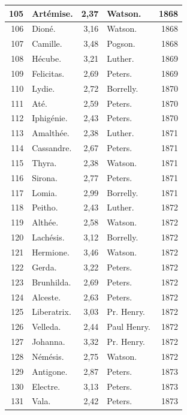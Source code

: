 \documentclass[a4paper, 11pt, oneside]{article}
\begin{document}
\begin{center}
\begin{longtable}{|r|l|r|l|r|}
        105 & Artémise. & 2,37 & Watson. & 1868 \\ \hline
        106 & Dioné. & 3,16 & Watson. & 1868 \\ \hline
        107 & Camille. & 3,48 & Pogson. & 1868 \\ \hline
        108 & Hécube. & 3,21 & Luther. & 1869 \\ \hline
        109 & Felicitas. & 2,69 & Peters. & 1869 \\ \hline
        110 & Lydie. & 2,72 & Borrelly. & 1870 \\ \hline
        111 & Até. & 2,59 & Peters. & 1870 \\ \hline
        112 & Iphigénie. & 2,43 & Peters. & 1870 \\ \hline
        113 & Amalthée. & 2,38 & Luther. & 1871 \\ \hline
        114 & Cassandre. & 2,67 & Peters. & 1871 \\ \hline
        115 & Thyra. & 2,38 & Watson. & 1871 \\ \hline
        116 & Sirona. & 2,77 & Peters. & 1871 \\ \hline
        117 & Lomia. & 2,99 & Borrelly. & 1871 \\ \hline
        118 & Peitho. & 2,43 & Luther. & 1872 \\ \hline
        119 & Althée. & 2,58 & Watson. & 1872 \\ \hline
        120 & Lachésis. & 3,12 & Borrelly. & 1872 \\ \hline
        121 & Hermione. & 3,46 & Watson. & 1872 \\ \hline
        122 & Gerda. & 3,22 & Peters. & 1872 \\ \hline
        123 & Brunhilda. & 2,69 & Peters. & 1872 \\ \hline
        124 & Alceste. & 2,63 & Peters. & 1872 \\ \hline
        125 & Liberatrix. & 3,03 & Pr. Henry. & 1872 \\ \hline
        126 & Velleda. & 2,44 & Paul Henry. & 1872 \\ \hline
        127 & Johanna. & 3,32 & Pr. Henry. & 1872 \\ \hline
        128 & Némésis. & 2,75 & Watson. & 1872 \\ \hline
        129 & Antigone. & 2,87 & Peters. & 1873 \\ \hline
        130 & Electre. & 3,13 & Peters. & 1873 \\ \hline
        131 & Vala. & 2,42 & Peters. & 1873 \\ \hline

\end{longtable}
\end{center}
\end{document}
